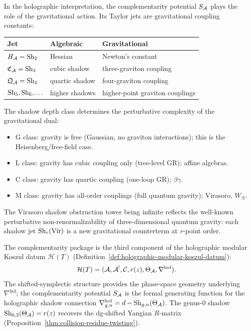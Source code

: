 \begin{remark}
\label{rem:thqg-III-gravitational-action}
In the holographic interpretation, the complementarity
potential $S_{\mathcal{A}}$ plays the role of the gravitational action.
Its Taylor jets are gravitational coupling constants:
\begin{center}
\renewcommand{\arraystretch}{1.2}
\begin{tabular}{l@{\quad}l@{\quad}l}
\textbf{Jet} & \textbf{Algebraic} & \textbf{Gravitational} \\
\midrule
$H_{\mathcal{A}} = \mathrm{Sh}_2$ & Hessian & Newton's constant \\
$\mathfrak{C}_{\mathcal{A}} = \mathrm{Sh}_3$ & cubic shadow &
 three-graviton coupling \\
$\mathfrak{Q}_{\mathcal{A}} = \mathrm{Sh}_4$ & quartic shadow &
 four-graviton coupling \\
$\mathrm{Sh}_5, \mathrm{Sh}_6, \ldots$ & higher shadows &
 higher-point graviton couplings \\
\end{tabular}
\end{center}
The shadow depth class determines the perturbative
complexity of the gravitational dual:
\begin{itemize}
\item G class: gravity is free (Gaussian, no graviton
 interactions); this is the Heisenberg/free-field case.
\item L class: gravity has cubic coupling only (tree-level
 GR); affine algebras.
\item C class: gravity has quartic coupling (one-loop
 GR); $\beta\gamma$.
\item M class: gravity has all-order couplings (full quantum
 gravity); Virasoro, $W_N$.
\end{itemize}
The Virasoro shadow obstruction tower being infinite reflects the
well-known perturbative non-renormalizability of
three-dimensional quantum gravity:
each shadow jet $\mathrm{Sh}_r(\mathrm{Vir})$ is a new
gravitational counterterm at $r$-point order.
\end{remark}

\begin{remark}
\label{rem:thqg-III-holographic-datum}
The complementarity package
is the third component of the holographic modular
Koszul datum $\mathcal{H}(T)$
(Definition~\ref{def:holographic-modular-koszul-datum}):
\[
\mathcal{H}(T) = (\mathcal{A}, \mathcal{A}^!, \mathcal{C}, r(z), \Theta_{\mathcal{A}},
\nabla^{\mathrm{hol}}).
\]
The shifted-symplectic structure provides the phase-space
geometry underlying $\nabla^{\mathrm{hol}}$; the
complementarity potential $S_{\mathcal{A}}$ is the formal generating
function for the holographic shadow connection
$\nabla_{g,n}^{\mathrm{hol}} = d - \mathrm{Sh}_{g,n}(\Theta_{\mathcal{A}})$.
The genus-$0$ shadow $\mathrm{Sh}_{0,2}(\Theta_{\mathcal{A}}) = r(z)$ recovers
the dg-shifted Yangian $R$-matrix
(Proposition~\ref{thm:collision-residue-twisting}).
\end{remark}

